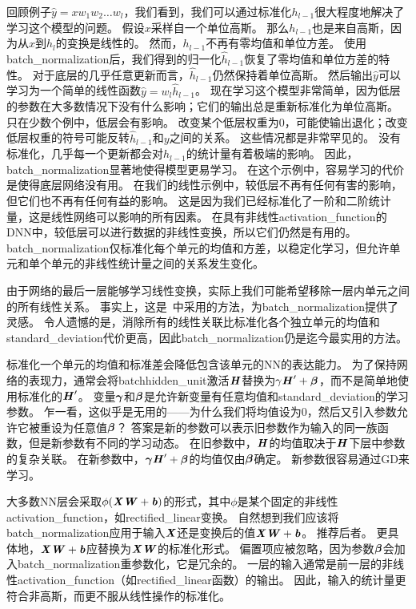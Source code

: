 回顾例子$\hat{y} = x w_1 w_2 \dots w_l$，我们看到，我们可以通过标准化$h_{l-1}$很大程度地解决了学习这个模型的问题。
假设$x$采样自一个单位高斯。
那么$h_{l-1}$也是来自高斯，因为从$x$到$h_l$的变换是线性的。
然而，$h_{l-1}$不再有零均值和单位方差。
使用\gls{batch_normalization}后，我们得到的归一化$\hat{h}_{l-1}$恢复了零均值和单位方差的特性。
对于底层的几乎任意更新而言，$\hat{h}_{l-1}$仍然保持着单位高斯。
然后输出$\hat{y}$可以学习为一个简单的线性函数$\hat{y} = w_l \hat{h}_{l-1}$。
现在学习这个模型非常简单，因为低层的参数在大多数情况下没有什么影响；它们的输出总是重新标准化为单位高斯。
只在少数个例中，低层会有影响。
改变某个低层权重为$0$，可能使输出退化；改变低层权重的符号可能反转$\hat{h}_{l-1}$和$y$之间的关系。
这些情况都是非常罕见的。
没有标准化，几乎每一个更新都会对$h_{l-1}$的统计量有着极端的影响。
因此，\gls{batch_normalization}显著地使得模型更易学习。
在这个示例中，容易学习的代价是使得底层网络没有用。
在我们的线性示例中，较低层不再有任何有害的影响，但它们也不再有任何有益的影响。
这是因为我们已经标准化了一阶和二阶统计量，这是线性网络可以影响的所有因素。
在具有非线性\gls{activation_function}的\gls{DNN}中，较低层可以进行数据的非线性变换，所以它们仍然是有用的。
\gls{batch_normalization}仅标准化每个单元的均值和方差，以稳定化学习，但允许单元和单个单元的非线性统计量之间的关系发生变化。

由于网络的最后一层能够学习线性变换，实际上我们可能希望移除一层内单元之间的所有线性关系。
事实上，这是~\cite{Desjardins2015}中采用的方法，为\gls{batch_normalization}提供了灵感。
令人遗憾的是，消除所有的线性关联比标准化各个独立单元的均值和\gls{standard_deviation}代价更高，因此\gls{batch_normalization}仍是迄今最实用的方法。


标准化一个单元的均值和标准差会降低包含该单元的\gls{NN}的表达能力。
为了保持网络的表现力，通常会将\gls{batch}\gls{hidden_unit}激活$\boldsymbol{\mathit{H}}$替换为$\gamma \boldsymbol{\mathit{H}}' + \boldsymbol{\beta}$，而不是简单地使用标准化的$\boldsymbol{\mathit{H}}'$。
变量$\boldsymbol{\gamma}$和$\boldsymbol{\beta}$是允许新变量有任意均值和\gls{standard_deviation}的学习参数。
乍一看，这似乎是无用的——为什么我们将均值设为$0$，然后又引入参数允许它被重设为任意值$\boldsymbol{\beta}$？
答案是新的参数可以表示旧参数作为输入的同一族函数，但是新参数有不同的学习动态。
在旧参数中，$\boldsymbol{\mathit{H}}$的均值取决于$\boldsymbol{\mathit{H}}$下层中参数的复杂关联。
在新参数中，$\boldsymbol{\gamma} \boldsymbol{\mathit{H}}' + \boldsymbol{\beta}$的均值仅由$\boldsymbol{\beta}$确定。
新参数很容易通过\gls{GD}来学习。

大多数\gls{NN}层会采取$\phi(\boldsymbol{\mathit{X}}\boldsymbol{\mathit{W}}+ \boldsymbol{\mathit{b}})$的形式，其中$\phi$是某个固定的非线性\gls{activation_function}，如\gls{rectified_linear}变换。
自然想到我们应该将\gls{batch_normalization}应用于输入$\boldsymbol{\mathit{X}}$还是变换后的值$\boldsymbol{\mathit{X}}\boldsymbol{\mathit{W}}+\boldsymbol{\mathit{b}}$。
\cite{Ioffe+Szegedy-2015}推荐后者。
更具体地，$\boldsymbol{\mathit{X}}\boldsymbol{\mathit{W}}+\boldsymbol{\mathit{b}}$应替换为$\boldsymbol{\mathit{X}}\boldsymbol{\mathit{W}}$的标准化形式。
偏置项应被忽略，因为参数$\boldsymbol{\beta}$会加入\gls{batch_normalization}重参数化，它是冗余的。
一层的输入通常是前一层的非线性\gls{activation_function}（如\gls{rectified_linear}函数）的输出。
因此，输入的统计量更符合非高斯，而更不服从线性操作的标准化。

